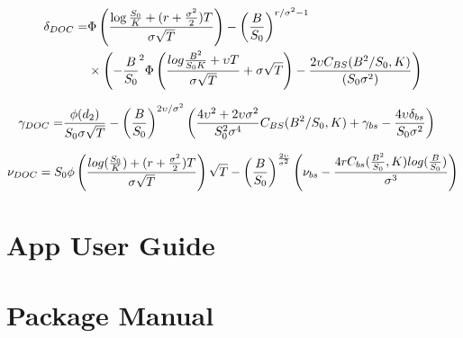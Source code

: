 \documentclass[11pt,a4paper,fleqn]{article}
\begin{document}
\begin{align*}
\delta_{DOC} =& \Phi\left({\log{S_0 \over K} + (r + {\sigma^2 \over 2})T \over \sigma\sqrt{T}}\right)- \left({B\over S_0}\right)^{r /\sigma^2 - 1}\\
&\times \left(-{B\over S_0}^2 \Phi\left({log{B^2 \over S_0K} + \upsilon T \over \sigma \sqrt{T}} + \sigma \sqrt{T}\right) - {2 \upsilon C_{BS}(B^2 / S_0, K) \over (S_0\sigma^2)}\right)
\end{align*}

\begin{align*}
\gamma_{DOC} =& {\phi(d_2) \over S_0\sigma\sqrt{T}}- \left({B \over S_0}\right)^{ 2\upsilon / \sigma^2}\left({4\upsilon^2 +2\upsilon \sigma^2\over S_0^2\sigma^4}C_{BS}(B^2 / S_0, K) + \gamma_{bs} - {4\upsilon\delta_{bs} \over S_0\sigma^2}\right)
\end{align*}

\begin{align*}
\nu_{DOC} = S_0\phi\left(\frac{log({S_0 \over K}) + (r + {\sigma^2 \over 2})T}{\sigma\sqrt{T}}\right)\sqrt{T}-\left({B \over S_0}\right)^{2\upsilon \over \sigma^2}\left(\nu_{bs} - {4rC_{bs}({B^2\over S_0}, K)log({B\over S_0}) \over \sigma^3}\right)
\end{align*}

\newpage
\section{App User Guide}


\newpage
\section{Package Manual}
\end{document}
